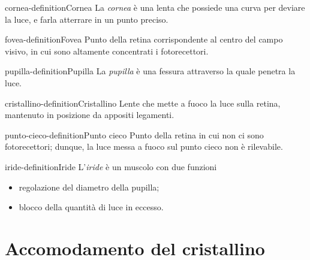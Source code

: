 \documentclass[preview]{standalone}
\begin{document}
\begin{snippetdefinition}{cornea-definition}{Cornea}
    La \textit{cornea} è una lenta che possiede una curva per deviare la luce, e farla atterrare in un punto preciso.
\end{snippetdefinition}

\begin{snippetdefinition}{fovea-definition}{Fovea}
    Punto della retina corrispondente al centro del campo visivo, in cui sono altamente
    concentrati i fotorecettori.
\end{snippetdefinition}

\begin{snippetdefinition}{pupilla-definition}{Pupilla}
    La \textit{pupilla} è una fessura attraverso la quale penetra la luce. 
\end{snippetdefinition}

\begin{snippetdefinition}{cristallino-definition}{Cristallino}
    Lente che mette a fuoco la luce sulla retina, mantenuto in posizione da appositi legamenti.
\end{snippetdefinition}

\begin{snippetdefinition}{punto-cieco-definition}{Punto cieco}
    Punto della retina in cui non ci sono fotorecettori; dunque, la luce messa a fuoco sul punto
    cieco non è rilevabile.
\end{snippetdefinition}

\begin{snippetdefinition}{iride-definition}{Iride}
    L'\textit{iride} è un muscolo con due funzioni
    \begin{itemize}
        \item regolazione del diametro della pupilla;
        \item blocco della quantità di luce in eccesso.
    \end{itemize}
\end{snippetdefinition}

\section{Accomodamento del cristallino}
\end{document}
